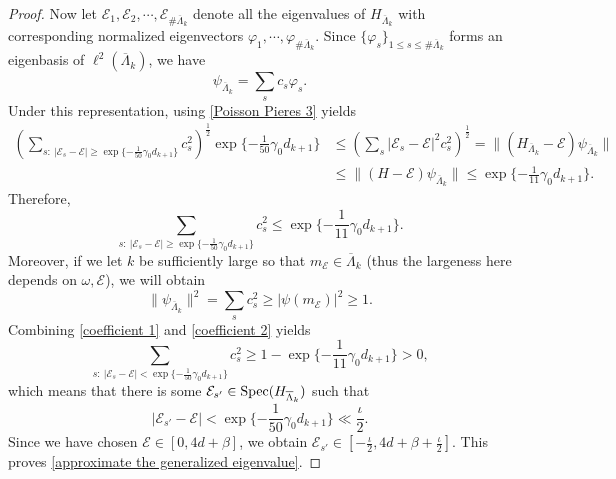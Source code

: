 \documentclass[11pt,reqno,UTF8,twoside]{amsart}
\newcommand{\spec}{{\rm Spec}}
\newcommand{\barLambda}{\overline{\Lambda}}
\newcommand{\mcE}{\mathcal{E}}
\theoremstyle{definition}
\numberwithin{equation}{section}
\begin{document}
\begin{proof}
Now let $\mcE_1,\mcE_2,\cdots,\mcE_{\# \barLambda_k}$ denote all  the eigenvalues of $H_{\barLambda_k}$ with corresponding normalized eigenvectors $\varphi_1,\cdots ,\varphi_{\# \barLambda_k}$. Since $\{\varphi_s\}_{1\leq s\leq \#\barLambda_k}$ forms an eigenbasis of $\ell^{2}(\barLambda_k)$, we have 
\[\psi_{\barLambda_k}=\sum_{s} c_s\varphi_s.\] 
Under this representation, using \eqref{Poisson Pieres 3} yields 
\begin{align*}
\left(\sum_{s:\ |\mcE_s-\mcE|\geq \exp\{-\frac{1}{50}\gamma_0 d_{k+1}\}}  c_s^2\right)^{\frac{1}{2}} \exp\{-\frac{1}{50}\gamma_0 d_{k+1}\} & \leq \left(\sum_{s} |\mcE_s-\mcE|^2 c_s^2\right)^{\frac{1}{2}}  = \|(H_{\barLambda_k}-\mcE)\psi_{\barLambda_k} \| \\
       & \leq  \| (H-\mcE) \psi_{\barLambda_k} \|\leq \exp\{-\frac{1}{11}\gamma_0 d_{k+1}\}.
\end{align*}
Therefore,
\begin{equation}\label{coefficient 1}
  \sum_{s:\ |\mcE_s-\mcE|\geq \exp\{-\frac{1}{50}\gamma_0 d_{k+1}\}}  c_s^2 \leq \exp\{-\frac{1}{11}\gamma_0 d_{k+1}\}.
\end{equation}
Moreover, if we let $k$ be sufficiently large so that  $m_{\mcE}\in \barLambda_k$ (thus the largeness here depends  on $\omega,\mcE$), we will obtain 
\begin{equation}\label{coefficient 2}
  \| \psi_{\barLambda_k} \|^2  =\sum_{s}c_s^2 \geq |\psi(m_{\mcE})|^2 \geq 1.
\end{equation}
Combining \eqref{coefficient 1} and \eqref{coefficient 2} yields 
\[ \sum_{s:\ |\mcE_s-\mcE|< \exp\{-\frac{1}{50}\gamma_0 d_{k+1}\} } c_s^2\geq 1- \exp\{-\frac{1}{11}\gamma_0 d_{k+1}\}>0,\]
which means that there is some  $\mcE_{s'}\in \spec(H_{\barLambda_k})$ such that 
\[|\mcE_{s'}-\mcE|< \exp\{-\frac{1}{50}\gamma_0 d_{k+1}\}\ll \frac{\iota}{2}.\]
Since we have chosen  $\mcE\in [0,4d+\beta]$, we obtain $\mcE_{s'}\in [-\frac{\iota}{2},4d+\beta+\frac{\iota}{2}]$. This proves \eqref{approximate the generalized eigenvalue}.





\end{proof}
\end{document}
